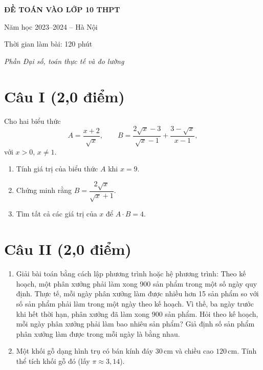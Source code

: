 \documentclass[12pt,a4paper]{article}
\begin{document}
\begin{center}
{\Large\bfseries ĐỀ TOÁN VÀO LỚP 10 THPT}\par
Năm học 2023--2024 -- Hà Nội\par
Thời gian làm bài: 120 phút\par\smallskip
{\itshape Phần Đại số, toán thực tế và đo lường}
\end{center}

\section*{Câu I (2,0 điểm)}
Cho hai biểu thức
\[
A=\frac{x+2}{\sqrt{x}},\qquad
B=\frac{2\sqrt{x}-3}{\sqrt{x}-1}+\frac{3-\sqrt{x}}{x-1},
\]
với $x>0$, $x\ne 1$.
\begin{enumerate}
  \item Tính giá trị của biểu thức $A$ khi $x=9$.
  \item Chứng minh rằng $B=\dfrac{2\sqrt{x}}{\sqrt{x}+1}$.
  \item Tìm tất cả các giá trị của $x$ để $A\cdot B=4$.
\end{enumerate}

\section*{Câu II (2,0 điểm)}
\begin{enumerate}
  \item Giải bài toán bằng cách lập phương trình hoặc hệ phương trình: Theo kế hoạch, một phân xưởng phải làm xong 900 sản phẩm trong một số ngày quy định. Thực tế, mỗi ngày phân xưởng làm được nhiều hơn 15 sản phẩm so với số sản phẩm phải làm trong một ngày theo kế hoạch. Vì thế, ba ngày trước khi hết thời hạn, phân xưởng đã làm xong 900 sản phẩm. Hỏi theo kế hoạch, mỗi ngày phân xưởng phải làm bao nhiêu sản phẩm? Giả định số sản phẩm phân xưởng làm được trong mỗi ngày là bằng nhau.
  \item Một khối gỗ dạng hình trụ có bán kính đáy $30\,\mathrm{cm}$ và chiều cao $120\,\mathrm{cm}$. Tính thể tích khối gỗ đó (lấy $\pi\approx3{,}14$).
\end{enumerate}
\end{document}
